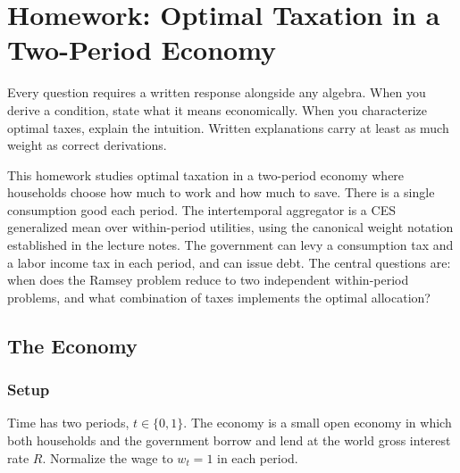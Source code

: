 \chapter{Homework: Optimal Taxation in a Two-Period Economy}
\label{chap:hw-dynamic}
 
\begin{calloutimportant}
Every question requires a written response alongside any algebra. When you derive a condition, state what it means economically. When you characterize optimal taxes, explain the intuition. Written explanations carry at least as much weight as correct derivations.
\end{calloutimportant}
 
\begin{calloutnote}[Goal]
This homework studies optimal taxation in a two-period economy where households choose how much to work and how much to save. There is a single consumption good each period. The intertemporal aggregator is a CES generalized mean over within-period utilities, using the canonical weight notation established in the lecture notes. The government can levy a consumption tax and a labor income tax in each period, and can issue debt. The central questions are: when does the Ramsey problem reduce to two independent within-period problems, and what combination of taxes implements the optimal allocation?
\end{calloutnote}
 
\section{The Economy}
\label{sec:economy}
 
\subsection{Setup}
\label{subsec:setup}
 
Time has two periods, $t \in \{0, 1\}$. The economy is a small open economy in which both households and the government borrow and lend at the world gross interest rate $R$. Normalize the wage to $w_t = 1$ in each period.
 
